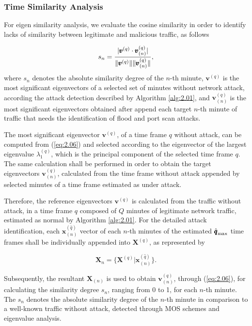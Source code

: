 \subsubsection{Time Similarity Analysis}
\label{sec:2_prop_TimeSimilarityAnalysis}
For eigen similarity analysis, we evaluate the cosine similarity in order to identify lacks of similarity between legitimate and malicious traffic, as follows

\begin{equation}\label{eq:2.11}
s_n = \frac{\lvert\pmb{v}^{(q)} \cdot \pmb{v}_{(n)}^{(q)}\rvert}{\lVert\pmb{v}^{(q)}\rVert\lVert\pmb{v}_{(n)}^{(q)}\rVert},
\end{equation}
where $s_n$ denotes the absolute similarity degree of the $n$-th minute, $\pmb{v}^{(q)}$ is the most significant eigenvectors of a selected set of minutes without network attack, according the attack detection described by Algorithm \ref{alg:2.01}, and $\pmb{v}_{(n)}^{(q)}$ is the most significant eigenvectors obtained after append each target $n$-th minute of traffic that needs the identification of flood and port scan attacks.

The most significant eigenvector $\pmb{v}^{(q)}$, of a time frame $q$ without attack, can be computed from (\ref{eq:2.06}) and selected according to the eigenvector of the largest eigenvalue $\lambda_1^{(q)}$, which is the principal component of the selected time frame $q$. The same calculation shall be performed in order to obtain the target eigenvectors $\pmb{v}_{(n)}^{(q)}$, calculated from the time frame without attack appended by selected minutes of a time frame estimated as under attack.

Therefore, the reference eigenvectors $\pmb{v}^{(q)}$ is calculated from the traffic without attack, in a time frame $q$ composed of $Q$ minutes of legitimate network traffic, estimated as normal by Algorithm \ref{alg:2.01}. For the detailed attack identification, each $\pmb{x}^{(\hat{q})}_{(n)}$ vector of each $n$-th minutes of the estimated $\rm{\hat{\pmb{q}}}_{\rm max}$ time frames shall be individually appended into $\pmb{X}^{(q)}$, as represented by

\begin{equation}\label{eq:2.12}
\pmb{X}_{n} = \{\pmb{X}^{(q)} | \pmb{x}^{(\hat{q})}_{(n)}\}.
\end{equation}

Subsequently, the resultant $\pmb{X}_{(n)}$ is used to obtain $\pmb{v}_{(n)}^{(q)}$, through (\ref{eq:2.06}), for calculating the similarity degree $s_n$, ranging from 0 to 1, for each $n$-th minute. The $s_n$ denotes the absolute similarity degree of the $n$-th minute in comparison to a well-known traffic without attack, detected through MOS schemes and eigenvalue analysis.

